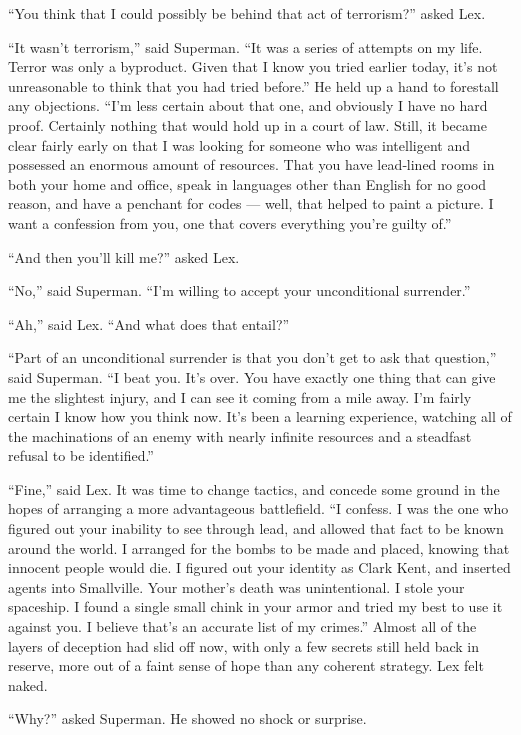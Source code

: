 ``You think that I could possibly be behind that act of terrorism?''
asked Lex.

``It wasn't terrorism,'' said Superman. ``It was a series of attempts on
my life. Terror was only a byproduct. Given that I know you tried
earlier today, it's not unreasonable to think that you had tried
before.'' He held up a hand to forestall any objections. ``I'm less
certain about that one, and obviously I have no hard proof. Certainly
nothing that would hold up in a court of law. Still, it became clear
fairly early on that I was looking for someone who was intelligent and
possessed an enormous amount of resources. That you have lead‐lined
rooms in both your home and office, speak in languages other than
English for no good reason, and have a penchant for codes --- well, that
helped to paint a picture. I want a confession from you, one that covers
everything you're guilty of.''

``And then you'll kill me?'' asked Lex.

``No,'' said Superman. ``I'm willing to accept your unconditional
surrender.''

``Ah,'' said Lex. ``And what does that entail?''

``Part of an unconditional surrender is that you don't get to ask that
question,'' said Superman. ``I beat you. It's over. You have exactly one
thing that can give me the slightest injury, and I can see it coming
from a mile away. I'm fairly certain I know how you think now. It's been
a learning experience, watching all of the machinations of an enemy with
nearly infinite resources and a steadfast refusal to be identified.''

``Fine,'' said Lex. It was time to change tactics, and concede some
ground in the hopes of arranging a more advantageous battlefield. ``I
confess. I was the one who figured out your inability to see through
lead, and allowed that fact to be known around the world. I arranged for
the bombs to be made and placed, knowing that innocent people would die.
I figured out your identity as Clark Kent, and inserted agents into
Smallville. Your mother's death was unintentional. I stole your
spaceship. I found a single small chink in your armor and tried my best
to use it against you. I believe that's an accurate list of my crimes.''
Almost all of the layers of deception had slid off now, with only a few
secrets still held back in reserve, more out of a faint sense of hope
than any coherent strategy. Lex felt naked.

``Why?'' asked Superman. He showed no shock or surprise.

